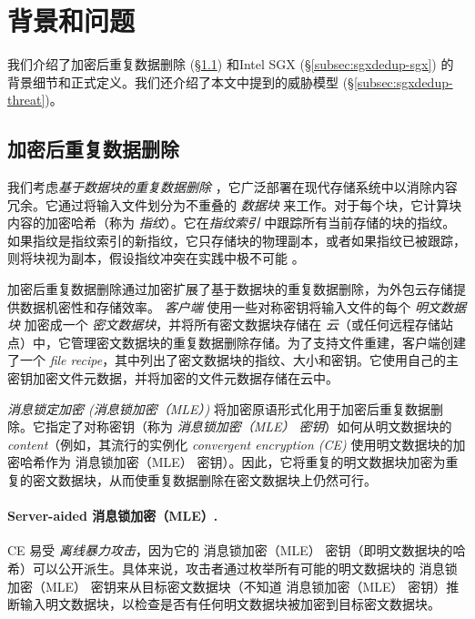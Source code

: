 \section{背景和问题}
\label{sec:sgxdedup-background}

我们介绍了加密后重复数据删除 (\S\ref{subsec:sgxdedup-encrypted-dedup}) 和Intel SGX (\S\ref{subsec:sgxdedup-sgx}) 的背景细节和正式定义。我们还介绍了本文中提到的威胁模型 (\S\ref{subsec:sgxdedup-threat})。

\subsection{加密后重复数据删除}
\label{subsec:sgxdedup-encrypted-dedup}

{\bf } 我们考虑\textit{基于数据块的重复数据删除} \cite{zhu2008avoiding,wallace12,meyer11}，它广泛部署在现代存储系统中以消除内容冗余。它通过将输入文件划分为不重叠的 \textit{数据块} 来工作。对于每个块，它计算块内容的加密哈希（称为 \textit{指纹}）。它在\textit{指纹索引} 中跟踪所有当前存储的块的指纹。如果指纹是指纹索引的新指纹，它只存储块的物理副本，或者如果指纹已被跟踪，则将块视为副本，假设指纹冲突在实践中极不可能 \cite{black2006compare}。
   
加密后重复数据删除通过加密扩展了基于数据块的重复数据删除，为外包云存储提供数据机密性和存储效率。 \textit{ 客户端} 使用一些对称密钥将输入文件的每个 \textit{ 明文数据块} 加密成一个 \textit{ 密文数据块}，并将所有密文数据块存储在 \textit{ 云}（或任何远程存储站点）中，它管理密文数据块的重复数据删除存储。为了支持文件重建，客户端创建了一个 \textit{ file recipe}，其中列出了密文数据块的指纹、大小和密钥。它使用自己的主密钥加密文件元数据，并将加密的文件元数据存储在云中。

\textit{ 消息锁定加密 (消息锁加密（MLE）)} \cite{bellare2013MLE} 将加密原语形式化用于加密后重复数据删除。它指定了对称密钥（称为 \textit{ 消息锁加密（MLE） 密钥}）如何从明文数据块的 \textit{ content}（例如，其流行的实例化 \textit{ convergent encryption (CE)} \cite{douceur02}使用明文数据块的加密哈希作为 消息锁加密（MLE） 密钥）。因此，它将重复的明文数据块加密为重复的密文数据块，从而使重复数据删除在密文数据块上仍然可行。

\paragraph*{Server-aided 消息锁加密（MLE）.} CE 易受 \textit{ 离线暴力攻击}，因为它的 消息锁加密（MLE） 密钥（即明文数据块的哈希）可以公开派生。具体来说，攻击者通过枚举所有可能的明文数据块的 消息锁加密（MLE） 密钥来从目标密文数据块（不知道 消息锁加密（MLE） 密钥）推断输入明文数据块，以检查是否有任何明文数据块被加密到目标密文数据块。

